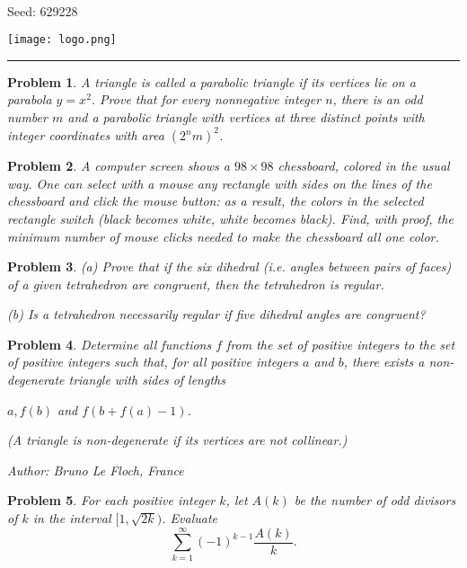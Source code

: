 \documentclass[12pt]{article}
\newtheorem{opg}{Problem}
\begin{document}
\parbox{0.6\textwidth}{ \\[2ex] {\Large Seed: 629228}}
\parbox{0.4\textwidth}{\texttt{[image: logo.png]}}

\hrule

\begin{opg}
A triangle is called a parabolic triangle if its vertices lie on a
parabola $y = x^2$. Prove that for every nonnegative integer $n$, there
is an odd number $m$ and a parabolic triangle with vertices at three
distinct points with integer coordinates with area $(2^nm)^2$.


\end{opg}
\begin{opg}
A computer screen shows a $98 \times 98$ chessboard, colored in the usual way. One can select with a mouse any rectangle with sides on the lines of the chessboard and click the mouse button: as a result,  the colors in the selected rectangle switch (black becomes white, white becomes black). Find, with proof, the minimum number of mouse clicks needed to make the chessboard all one color.


\end{opg}
\begin{opg}
(a) Prove that if the six dihedral (i.e. angles between pairs of faces) of a given tetrahedron are congruent, then the tetrahedron is regular.

(b) Is a tetrahedron necessarily regular if five dihedral angles are congruent?


\end{opg}
\begin{opg}
Determine all functions $f$ from the set of positive integers to the set of positive integers such that, for all positive integers $a$ and $b$, there exists a non-degenerate triangle with sides of lengths 


 $a,f(b)$ and $f(b+f(a)-1)$. 

(A triangle is non-degenerate if its vertices are not collinear.) 

Author: Bruno Le Floch, France


\end{opg}
\begin{opg}
For each positive integer $k$, let $A(k)$ be the number of odd divisors of $k$ in the interval $[1, \sqrt{2k})$. Evaluate
\[
\sum_{k=1}^\infty (-1)^{k-1} \frac{A(k)}{k}.
\]

\end{opg}
\end{document}
